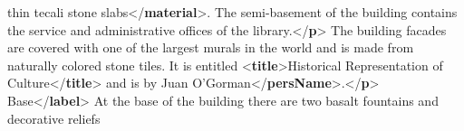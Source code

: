 \begin{shaded}
\hspace*{1em}\hspace*{1em}thin tecali stone slabs{</\textbf{material}>}. The semi-basement of the building contains the service\mbox{}\newline 
\hspace*{1em}\hspace*{1em}\hspace*{1em}\hspace*{1em}\hspace*{1em}\hspace*{1em} and administrative offices of the library.{</\textbf{p}>}\mbox{}\newline 
\hspace*{1em}\hspace*{1em}The building facades are covered with one of the largest murals in the world and is made from naturally\mbox{}\newline 
\hspace*{1em}\hspace*{1em}\hspace*{1em}\hspace*{1em}\hspace*{1em}\hspace*{1em} colored stone tiles. It is entitled {<\textbf{title}>}Historical Representation of Culture{</\textbf{title}>} and is by\mbox{}\newline 
\hspace*{1em}\hspace*{1em}Juan O'Gorman{</\textbf{persName}>}.{</\textbf{p}>}\mbox{}\newline 
\hspace*{1em}\mbox{}\newline 
\hspace*{1em}\mbox{}\newline 
\hspace*{1em}\hspace*{1em}\mbox{}\newline 
\hspace*{1em}\hspace*{1em}\hspace*{1em}Base{</\textbf{label}>} At the base of the building there are two basalt fountains and decorative reliefs\mbox{}\newline 

\end{shaded}
